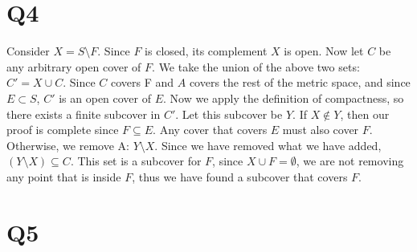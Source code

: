 \documentclass[12pt]{article}
\begin{document}
\section{Q4}
Consider $X = S \setminus F$. Since $F$ is closed, its complement $X$ is open. Now let $C$ be any arbitrary open cover of $F$. We take the union of the above two sets: $C' = X \cup C$. Since $C$ covers F and $A$ covers the rest of the metric space, and since $E \subset S$, $C'$ is an open cover of $E$.
\newline
Now we apply the definition of compactness, so there exists a finite subcover in $C'$. Let this subcover be $Y$. If $X \not\in Y$, then our proof is complete since $F \subseteq E$. Any cover that covers $E$ must also cover $F$.
\newline
Otherwise, we remove A: $Y \setminus X$. Since we have removed what we have added, $(Y \setminus X) \subseteq C$. This set is a subcover for $F$, since $X \cup F = \emptyset$, we are not removing any point that is inside $F$, thus we have found a subcover that covers $F$.
\newpage


\section{Q5}
\end{document}
